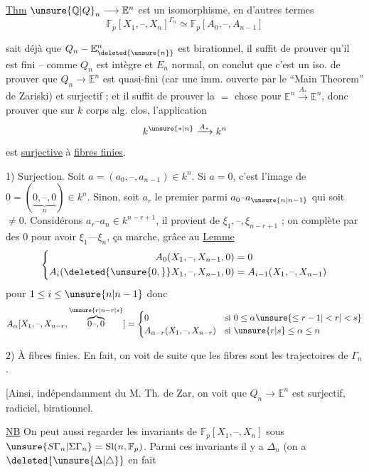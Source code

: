 \uline{Thm} $\unsure{\mathbb Q|Q}_n\longrightarrow\mathbb E^n$ est un isomorphisme, en d'autres termes
\[ \mathbb F_p[X_1,\text{--},X_n]^{\Gamma_n}\simeq\mathbb F_p[A_0,\text{--},A_{n-1}] \]

 sait déjà que $Q_n\mathbin{-}\mathbb E_{\deleted{\unsure{n}}}^{n}$ est birationnel, il suffit de prouver qu'il est fini  -- comme $Q_n$ est intègre et $E_n$ normal, on conclut que c'est un iso.
   de prouver que $Q_n\to\mathbb E^n$  est quasi-fini (car  une imm. ouverte par le
``Main Theorem'' de Zariski) et surjectif ; et il suffit de prouver la $=$ chose pour $\mathbb E^n\xrightarrow{A_*}\mathbb E^n$, donc prouver que sur $k$ corps alg. clos, l'application
\[ k^{\unsure{*|n}}\xrightarrow{A_*}k^n \]
est \uline{surjective} à \uline{fibres finies}.

1) Surjection. Soit $a=(a_0,\text{--},a_{n-1})\in k^n$. Si $a=0$, c'est l'image de $0=(\underbrace{0,\text{--},0}_{n})\in k^n$. 
Sinon, soit $a_r$ le premier parmi $a_0\text{--}a_{\unsure{n|n-1}}$ qui soit $\neq0$. Considérons $a_r\text{--}a_n\in k^{n-r+1}$, il provient de $\xi_1,\text{--},\xi_{n-r+1}$ ; on complète par des $0$ pour avoir $\xi_1\text{---}\xi_n$, ça marche, grâce au
\uline{Lemme} \[
\left\{\begin{aligned}
 A_0(X_1,\text{--},X_{n-1},0)&=0\\
 A_i(\deleted{\unsure{0,}}X_1,\text{--},X_{n-1},0)&=A_{i-1}(X_1,\text{--},X_{n-1})
\end{aligned}\right.
\]
pour $1\leq i\leq\unsure{n|n-1}$
donc
\[
 A_\alpha[X_1,\text{--},X_{n-r},\overbrace{0\text{--},0}^{\unsure{r|n-r|s}}]
 =\begin{cases}
 0&\text{si }0\leq\alpha\unsure{\leq r-1|<r|<s}\\
 A_{\alpha-r}(X_1,\text{--},X_{n-r})&\text{si }\unsure{r|s}\leq\alpha\leq n
 \end{cases}
\]

2) À fibres finies. En fait, on voit  de suite que les fibres sont les trajectoires de $\Gamma_n$.

[Ainsi, indépendamment du M. Th. de Zar, on voit que $Q_n\to\mathbb E^n$ est surjectif, radiciel, birationnel.

\uline{NB} On peut aussi regarder les invariants de $\mathbb F_p[X_1,\text{--},X_n]$ sous $\unsure{S\Gamma_n|\Sigma\Gamma_n}=\operatorname{Sl}(n,\mathbb F_p)$. Parmi ces invariants il y a $\Delta_n$ (on a $\deleted{\unsure{\Delta|\triangle}}$ en fait
